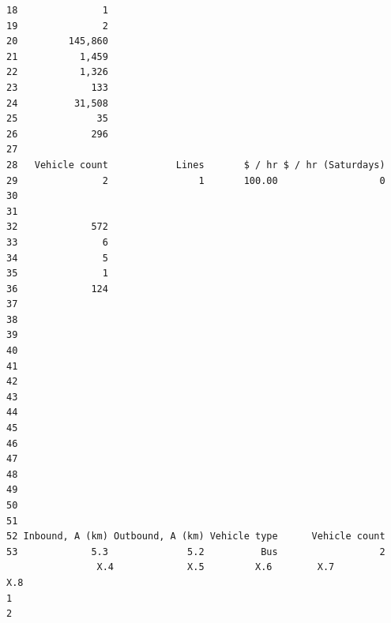 \documentclass[
11pt, %
oneside, %
english, %
singlespacing, %
]{macthesis} %
\begin{document}
\begin{verbatim}
18               1                                                 
19               2                                                 
20         145,860                                                 
21           1,459                                                 
22           1,326                                                 
23             133                                                 
24          31,508                                                 
25              35                                                 
26             296                                                 
27                                                                 
28   Vehicle count            Lines       $ / hr $ / hr (Saturdays)
29               2                1       100.00                  0
30                                                                 
31                                                                 
32             572                                                 
33               6                                                 
34               5                                                 
35               1                                                 
36             124                                                 
37                                                                 
38                                                                 
39                                                                 
40                                                                 
41                                                                 
42                                                                 
43                                                                 
44                                                                 
45                                                                 
46                                                                 
47                                                                 
48                                                                 
49                                                                 
50                                                                 
51                                                                 
52 Inbound, A (km) Outbound, A (km) Vehicle type      Vehicle count
53             5.3              5.2          Bus                  2
                X.4             X.5         X.6        X.7             X.8
1                                                                         
2                                                                         

\end{verbatim}
\end{document}
